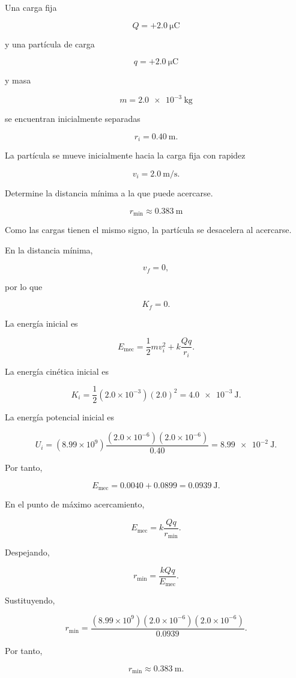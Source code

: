 \begin{ejercicio}

Una carga fija

\[
Q=+\SI{2.0}{\micro\coulomb}
\]

y una partícula de carga

\[
q=+\SI{2.0}{\micro\coulomb}
\]

y masa

\[
m=\SI{2.0e-3}{\kilogram}
\]

se encuentran inicialmente separadas

\[
r_i=\SI{0.40}{\metre}.
\]

La partícula se mueve inicialmente hacia la carga fija con rapidez

\[
v_i=\SI{2.0}{\metre\per\second}.
\]

Determine la distancia mínima a la que puede acercarse.

\end{ejercicio}

\begin{respuesta}

\[
\boxed{r_{\min}\approx\SI{0.383}{\metre}}
\]

\end{respuesta}

\begin{explicacion}

Como las cargas tienen el mismo signo, la partícula se desacelera al acercarse.

En la distancia mínima,

\[
v_f=0,
\]

por lo que

\[
K_f=0.
\]

La energía inicial es

\[
E_{\text{mec}}
=
\frac12mv_i^2
+
k\frac{Qq}{r_i}.
\]

La energía cinética inicial es

\[
K_i
=
\frac12(2.0\times10^{-3})(2.0)^2
=
\SI{4.0e-3}{\joule}.
\]

La energía potencial inicial es

\[
U_i
=
(8.99\times10^9)
\frac{(2.0\times10^{-6})(2.0\times10^{-6})}{0.40}
=
\SI{8.99e-2}{\joule}.
\]

Por tanto,

\[
E_{\text{mec}}
=
0.0040+0.0899
=
\SI{0.0939}{\joule}.
\]

En el punto de máximo acercamiento,

\[
E_{\text{mec}}
=
k\frac{Qq}{r_{\min}}.
\]

Despejando,

\[
r_{\min}
=
\frac{kQq}{E_{\text{mec}}}.
\]

Sustituyendo,

\[
r_{\min}
=
\frac{(8.99\times10^9)(2.0\times10^{-6})(2.0\times10^{-6})}
{0.0939}.
\]

Por tanto,

\[
\boxed{r_{\min}\approx\SI{0.383}{\metre}}.
\]

\end{explicacion}


